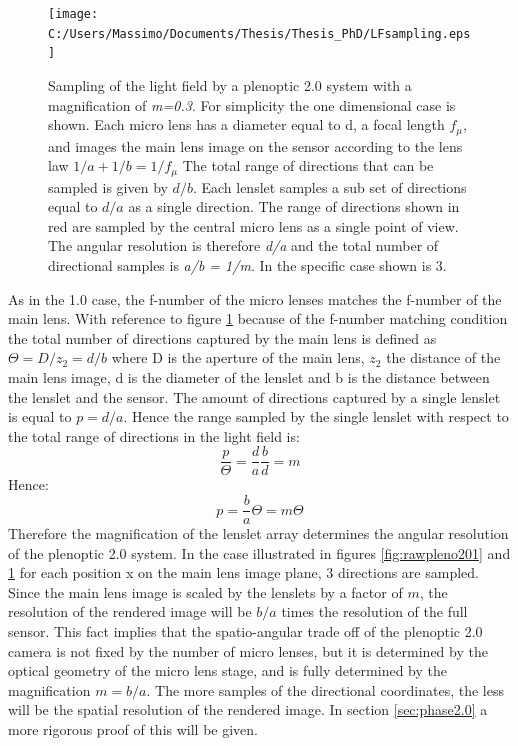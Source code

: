   \begin{figure}[H]
  	\centering
  	\texttt{[image: C:/Users/Massimo/Documents/Thesis/Thesis\_PhD/LFsampling.eps]}
  	\caption{\label{fig:rawpleno202}Sampling of the light field by a plenoptic 2.0 system with a magnification of \textit{m=0.3}. For simplicity the one dimensional case is shown. Each micro lens has a diameter equal to d, a focal length $f_{\mu}$, and images the main lens image on the sensor according to the lens law $1/a+1/b=1/f_{\mu}$ The total range of directions that can be sampled is given by $d/b$. Each lenslet samples a sub set of directions equal to $d/a$ as a single direction. The range of directions shown in red are sampled by the central micro lens as a single point of view. The angular resolution is therefore \textit{d/a} and the total number of directional samples is \textit{a/b = 1/m}. In the specific case shown is 3. }
  \end{figure}
  As in the 1.0 case, the f-number of the micro lenses matches the f-number of the main lens.
 With reference to figure \ref{fig:rawpleno202} because of the f-number matching condition the total number of directions captured by the main lens is defined as $\Theta=D/z_2=d/b$ where D is the aperture of the main lens, $z_2$ the distance of the main lens image, d is the diameter of the lenslet and b is the distance between the lenslet and the sensor. The amount of directions captured by a single lenslet is equal to $p=d/a$. Hence the range sampled by the single lenslet with respect to the total range of directions in the light field is:
 \begin{equation}
 \label{eq:magnification}
 \dfrac{p}{\Theta}=\dfrac{d}{a}\dfrac{b}{d}=m
 \end{equation} 
 Hence:
  \begin{equation}
  \label{eq:magnification2}
  p=\dfrac{b}{a}\Theta=m\Theta
  \end{equation}
  Therefore the magnification of the lenslet array determines the angular resolution of the plenoptic 2.0 system. In the case illustrated in figures \ref{fig:rawpleno201} and \ref{fig:rawpleno202} for each position x on the main lens image plane, 3 directions are sampled. Since the main lens image is scaled by the lenslets by a factor of $m$, the resolution of the rendered image will be $b/a$ times the resolution of the full sensor. This fact implies that the spatio-angular trade off of the plenoptic 2.0 camera is not fixed by the number of micro lenses, but it is determined by the optical geometry of the micro lens stage, and is fully determined by the magnification $m=b/a$. The more samples of the directional coordinates, the less will be the spatial resolution of the rendered image. In section \ref{sec:phase2.0} a more rigorous proof of this will be given.
